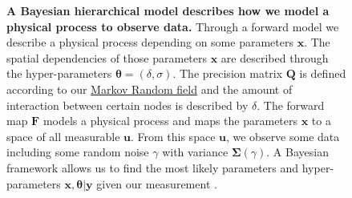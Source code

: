 \begin{figure}[thb!]
    \caption[A hierarchical Bayesian model describes how we model a physical process to observe data.]{\textbf{A Bayesian hierarchical model describes how we model a physical process to observe data.} Through a forward model we describe a physical process depending on some parameters $\bm{x}$.
    The spatial dependencies of those parameters $\bm{x}$ are described through the hyper-parameters $\bm{\theta} = (\delta, \sigma)$.
    The precision matrix $\bm{Q}$ is defined according to our \hyperref[subsec:MRF]{Markov Random field} and the amount of interaction between certain nodes is described by $\delta$.
    The forward map $\bm{F}$ models a physical process and maps the parameters $\bm{x}$ to a space of all measurable $\bm{u}$.
    From this space $\bm{u}$, we observe some data including some random noise $\gamma$ with variance $\bm{\Sigma}(\gamma)$.
    A Bayesian framework allows us to find the most likely parameters and hyper-parameters $\bm{x}, \bm{\theta}| \bm{y}$ given our measurement .}
    \label{fig:BAYHIER}
\end{figure}

